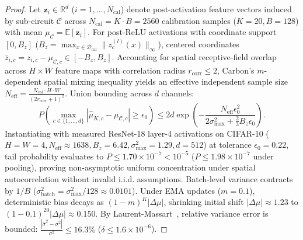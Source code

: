 \documentclass{article}
\begin{document}
\begin{proof}
Let $\mathbf{z}_i \in \mathbb{R}^d$ ($i=1, \dots, N_{\text{cal}}$) denote post-activation feature vectors induced by sub-circuit $\mathcal{C}$ across $N_{\text{cal}} = K \cdot B = 2560$ calibration samples ($K=20, B=128$) with mean $\mu_{\mathcal{C}} = \mathbb{E}[\mathbf{z}_i]$. For post-ReLU activations with coordinate support $[0, B_z]$ ($B_z = \max_{x \in \mathcal{D}_{\text{cal}}} \|z_c^{(l)}(x)\|_\infty$), centered coordinates $\bar{z}_{i, c} = z_{i, c} - \mu_{\mathcal{C}, c} \in [-B_z, B_z]$. Accounting for spatial receptive-field overlap across $H \times W$ feature maps with correlation radius $r_{\mathrm{corr}} \le 2$, Carbon's $m$-dependent spatial mixing inequality yields an effective independent sample size $N_{\mathrm{eff}} = \frac{N_{\mathrm{cal}} \cdot H \cdot W}{(2r_{\mathrm{corr}} + 1)^2}$. Union bounding across $d$ channels:
\begin{equation}
    P\left( \max_{c \in \{1, \dots, d\}} |\hat{\mu}_{K, c} - \mu_{\mathcal{C}, c}| \geq \epsilon_0 \right) \leq 2d \exp\left( - \frac{N_{\mathrm{eff}} \epsilon_0^2}{2 \sigma_{\max}^2 + \frac{2}{3} B_z \epsilon_0} \right).
\end{equation}
Instantiating with measured ResNet-18 layer-4 activations on CIFAR-10 ($H=W=4, N_{\mathrm{eff}} \approx 1638, B_z = 6.42, \sigma_{\max}^2 = 1.29, d = 512$) at tolerance $\epsilon_0 = 0.22$, tail probability evaluates to $P \le 1.70 \times 10^{-7} < 10^{-5}$ ($P \le 1.98 \times 10^{-7}$ under pooling), proving non-asymptotic uniform concentration under spatial autocorrelation without invalid i.i.d. assumptions. Batch-level variance contracts by $1/B$ ($\sigma_{\text{batch}}^2 = \sigma_{\max}^2 / 128 \approx 0.0101$). Under EMA updates ($m=0.1$), deterministic bias decays as $(1-m)^K |\Delta \mu|$, shrinking initial shift $|\Delta \mu| \approx 1.23$ to $(1-0.1)^{20} |\Delta \mu| \approx 0.150$. By Laurent-Massart~\cite{massart1990tight}, relative variance error is bounded: $\frac{|\hat{\sigma}^2 - \sigma^2|}{\sigma^2} \le 16.3\%$ ($\delta \le 1.6 \times 10^{-6}$).


\end{proof}
\end{document}
